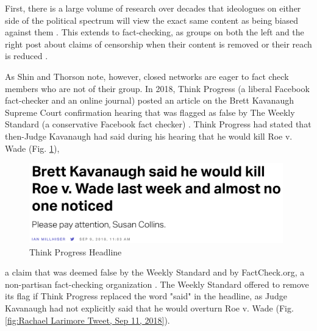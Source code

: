 \documentclass[preprint,review,12pt]{elsarticle}
\begin{document}
 First, there is a large volume of research over decades that ideologues on either side of the political spectrum will view the exact same content as being biased against them \cite{arpan2003experimental,baum2008eye,christen2002hostile,gunther2001predicting,gunther2004mapping,baum2004issue,gussin2004eye,lee2005liberal,vallone1985hostile}. This extends to fact-checking, as groups on both the left and the right post about claims of censorship when their content is removed or their reach is reduced \cite{Dreyfuss2020Now,Post2020Facebook,Millhiser2018Facebook}. 
 
 As Shin and Thorson note, however, closed networks are eager to fact check members who are not of their group. In 2018, Think Progress (a liberal Facebook fact-checker and an online journal) posted an article on the Brett Kavanaugh Supreme Court confirmation hearing that was flagged as false by The Weekly Standard (a conservative Facebook fact checker) \cite{lybrand2018kavanaugh}. Think Progress had stated that then-Judge Kavanaugh had said during his hearing that he would kill Roe v. Wade (Fig. \ref{fig:Think Progress Headline})\cite{millhiser2018brett},
  \begin{figure}[h]
    \centering
    \includegraphics[width=11cm]{ThinkProgress Headline.png}
    \caption{Think Progress Headline \cite{millhiser2018brett}}
    \label{fig:Think Progress Headline}
\end{figure} a claim that was deemed false by the Weekly Standard and by FactCheck.org, a non-partisan fact-checking organization \cite{gore2018kavanaugh}. The Weekly Standard offered to remove its flag if Think Progress replaced the word "said" in the headline, as Judge Kavanaugh had not explicitly said that he would overturn Roe v. Wade (Fig. \ref{fig:Rachael Larimore Tweet, Sep 11, 2018}).
 
\end{document}
